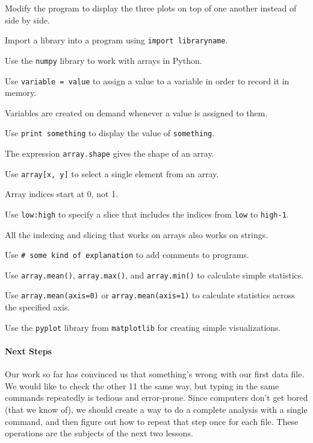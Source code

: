 \documentclass{book}
\begin{document}
\begin{challenge}
  Modify the program to display the three plots on top of one another
  instead of side by side.
\end{challenge}

\begin{keypoints}
\begin{swcitemize}
\item
  Import a library into a program using \texttt{import libraryname}.
\item
  Use the \texttt{numpy} library to work with arrays in Python.
\item
  Use \texttt{variable = value} to assign a value to a variable in order
  to record it in memory.
\item
  Variables are created on demand whenever a value is assigned to them.
\item
  Use \texttt{print something} to display the value of
  \texttt{something}.
\item
  The expression \texttt{array.shape} gives the shape of an array.
\item
  Use \texttt{array{[}x, y{]}} to select a single element from an array.
\item
  Array indices start at 0, not 1.
\item
  Use \texttt{low:high} to specify a slice that includes the indices
  from \texttt{low} to \texttt{high-1}.
\item
  All the indexing and slicing that works on arrays also works on
  strings.
\item
  Use \texttt{\# some kind of explanation} to add comments to programs.
\item
  Use \texttt{array.mean()}, \texttt{array.max()}, and
  \texttt{array.min()} to calculate simple statistics.
\item
  Use \texttt{array.mean(axis=0)} or \texttt{array.mean(axis=1)} to
  calculate statistics across the specified axis.
\item
  Use the \texttt{pyplot} library from \texttt{matplotlib} for creating
  simple visualizations.
\end{swcitemize}
\end{keypoints}

\mbox{}\paragraph{Next Steps}

Our work so far has convinced us that something's wrong with our first
data file. We would like to check the other 11 the same way, but typing
in the same commands repeatedly is tedious and error-prone. Since
computers don't get bored (that we know of), we should create a way to
do a complete analysis with a single command, and then figure out how to
repeat that step once for each file. These operations are the subjects
of the next two lessons.
\end{document}
